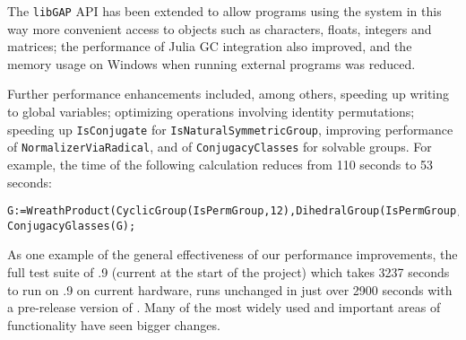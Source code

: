 The \texttt{libGAP} API has been extended
to allow programs using the system in this way
more convenient access to \GAP objects such as
characters, floats, integers
and matrices; 
the performance of Julia GC integration also improved,
and the memory usage on Windows when running external programs was reduced.

Further performance enhancements included, among others,
speeding up writing to global variables;
optimizing operations involving identity permutations;
speeding up \verb|IsConjugate| for \verb|IsNaturalSymmetricGroup|,
improving performance of \verb|NormalizerViaRadical|,
and of \verb|ConjugacyClasses| for solvable groups. For example, the time
of the following calculation reduces from 110 seconds to 53 seconds:

{\Small
\begin{verbatim}
G:=WreathProduct(CyclicGroup(IsPermGroup,12),DihedralGroup(IsPermGroup,12));
ConjugacyGlasses(G);
\end{verbatim}
}
\noindent

%
%
%



As one example of the general effectiveness of our performance
improvements, the full test suite of .9 (current at the
start of the project) which takes 3237 seconds to run on .9 on
current hardware, runs unchanged in just over 2900 seconds with a
pre-release version of . Many of the most widely used and
important areas of \GAP functionality have seen bigger changes.  

